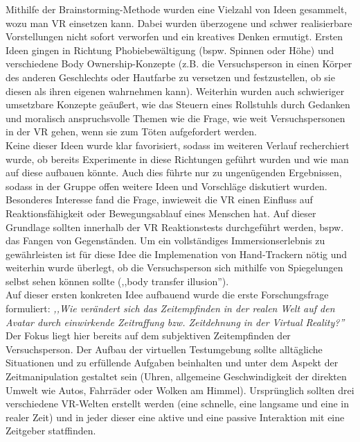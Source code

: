 \documentclass{Bericht}
\begin{document}
Mithilfe der Brainstorming-Methode wurden eine Vielzahl von Ideen gesammelt, wozu man VR einsetzen kann. Dabei wurden überzogene und schwer realisierbare Vorstellungen nicht sofort verworfen und ein kreatives Denken ermutigt.
Ersten Ideen gingen in Richtung Phobiebewältigung (bspw. Spinnen oder Höhe) und verschiedene Body Ownership-Konzepte (z.B. die Versuchsperson in einen Körper des anderen Geschlechts oder Hautfarbe zu versetzen und festzustellen, ob sie diesen als ihren eigenen wahrnehmen kann). Weiterhin wurden auch schwieriger umsetzbare Konzepte geäußert, wie das Steuern eines Rollstuhls durch Gedanken und moralisch anspruchsvolle Themen wie die Frage, wie weit Versuchspersonen in der VR gehen,
wenn sie zum Töten aufgefordert werden.\\
Keine dieser Ideen wurde klar favorisiert, sodass im weiteren Verlauf recherchiert wurde, ob bereits Experimente in diese Richtungen geführt wurden und wie man auf diese aufbauen könnte. Auch dies führte nur zu ungenügenden Ergebnissen, sodass in der Gruppe offen weitere Ideen und Vorschläge diskutiert wurden.\\
Besonderes Interesse fand die Frage, inwieweit die VR einen Einfluss auf Reaktionsfähigkeit oder Bewegungsablauf eines Menschen hat. Auf dieser Grundlage sollten innerhalb der VR Reaktionstests durchgeführt werden, bspw. das Fangen von Gegenständen. Um ein vollständiges Immersionserlebnis zu gewährleisten ist für diese Idee die Implemenation von Hand-Trackern nötig und weiterhin wurde überlegt, ob die Versuchsperson sich mithilfe von Spiegelungen selbst sehen können sollte (,,body transfer illusion'').\\
Auf dieser ersten konkreten Idee aufbauend wurde die erste Forschungsfrage formuliert:
\textit{,,Wie verändert sich das Zeitempfinden in der realen Welt auf den Avatar durch einwirkende Zeitraffung bzw. Zeitdehnung in der Virtual Reality?''}\\
	 Der Fokus liegt hier bereits auf dem subjektiven Zeitempfinden der Versuchsperson. Der Aufbau der virtuellen Testumgebung sollte alltägliche Situationen und zu erfüllende Aufgaben beinhalten und unter dem Aspekt der Zeitmanipulation gestaltet sein (Uhren, allgemeine Geschwindigkeit der direkten Umwelt wie Autos, Fahrräder oder Wolken am Himmel). 
Ursprünglich sollten drei verschiedene VR-Welten erstellt werden (eine schnelle, eine langsame und eine in realer Zeit) und in jeder dieser eine aktive und eine passive Interaktion mit eine Zeitgeber statffinden.
\end{document}
